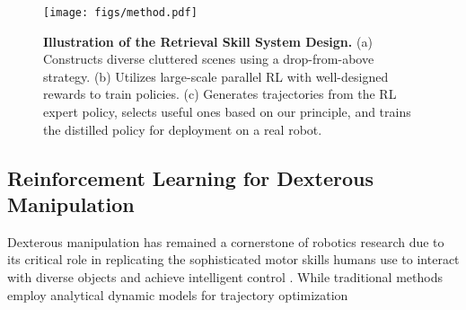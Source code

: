 \documentclass[10pt, a4paper, logo, twocolumn, copyright]{psibot} %
\begin{document}
\begin{figure*}
    \centering
    \texttt{[image: figs/method.pdf]}
    \caption{\textbf{Illustration of the Retrieval Skill System Design.} (a) Constructs diverse cluttered scenes using a drop-from-above strategy. (b) Utilizes large-scale parallel RL with well-designed rewards to train policies. (c) Generates trajectories from the RL expert policy, selects useful ones based on our principle, and trains the distilled policy for deployment on a real robot.}
    \label{fig:method}
\end{figure*}

\subsection{Reinforcement Learning for Dexterous Manipulation}
Dexterous manipulation has remained a cornerstone of robotics research due to its critical role in replicating the sophisticated motor skills humans use to interact with diverse objects and achieve intelligent control \cite{6907059,1087038,6907864}. While traditional methods employ analytical dynamic models for trajectory optimization
\end{document}
